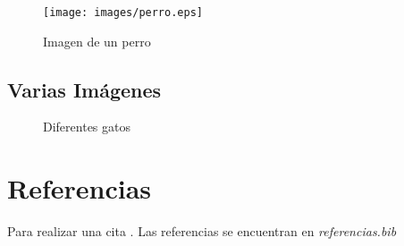 \begin{figure}[h]
	\centering %
	\texttt{[image: images/perro.eps]}
	\caption{Imagen de un perro}
	\caption*{{\cite{Bollacker:2008:FCC:1376616.1376746}}}
	\label{fig:perro}
\end{figure}


\subsection{Varias Imágenes}

\begin{figure}[ht]
	
	\centering


	
	\caption{Diferentes gatos}
	
	\label{fig:Distintos_gatos}
\end{figure}


\section{Referencias}

Para realizar una cita \cite{Bollacker:2008:FCC:1376616.1376746}. Las referencias se encuentran en \textit{referencias.bib}